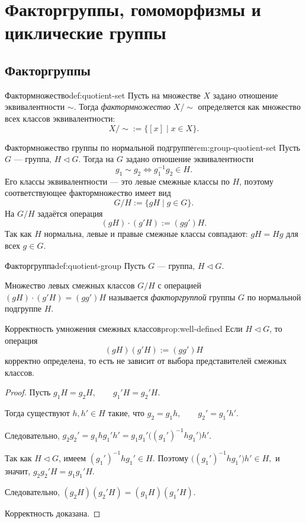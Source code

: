 
\section{Факторгруппы, гомоморфизмы и циклические группы}

\subsection{Факторгруппы}

\begin{Definition}{Фактормножество}{def:quotient-set}
	Пусть на множестве $X$ задано отношение эквивалентности $\sim$. Тогда \emph{фактормножество} $X/{\sim}$ определяется как множество всех классов эквивалентности:
	\[
	X/{\sim}:=\{[x] \mid x\in X\}.
	\]
\end{Definition}

\begin{Remark}{Фактормножество группы по нормальной подгруппе}{rem:group-quotient-set}
	Пусть $G$ --- группа, $H \triangleleft G$. Тогда на $G$ задано отношение эквивалентности
	\[
	g_1\sim g_2 \Longleftrightarrow g_1^{-1}g_2\in H.
	\]
	Его классы эквивалентности --- это левые смежные классы по $H$, поэтому соответствующее фактормножество имеет вид
	\[
	G/H:=\{gH\mid g\in G\}.
	\]
	На $G/H$ задаётся операция
	\[
	(gH)\cdot(g'H):=(gg')H.
	\]
	Так как $H$ нормальна, левые и правые смежные классы совпадают: $gH=Hg$ для всех $g\in G$.
\end{Remark}

\begin{Definition}{Факторгруппа}{def:quotient-group}
	Пусть $G$ — группа, $H \triangleleft G$. 
	
	Множество левых смежных классов $G/H$ с операцией $(gH) \cdot (g'H) = (gg')H$ называется \emph{факторгруппой} группы $G$ по нормальной подгруппе $H$.
\end{Definition}

\begin{Proposition}{Корректность умножения смежных классов}{prop:well-defined}
	Если $H \triangleleft G$, то операция
	\[
	(gH)(g'H) := (gg')H
	\]
	корректно определена, то есть не зависит от выбора представителей смежных классов.
\end{Proposition}

\begin{proof}
	Пусть $g_1H=g_2H, \qquad g_1'H=g_2'H$.
	
	Тогда существуют $h,h'\in H$ такие, что $g_2=g_1h, \qquad g_2'=g_1'h'$.

	Следовательно, $g_2g_2' = g_1 h g_1' h' = g_1 g_1'\bigl((g_1')^{-1} h g_1'\bigr)h'$.

	Так как $H \triangleleft G$, имеем $(g_1')^{-1} h g_1' \in H$. Поэтому $\bigl((g_1')^{-1} h g_1'\bigr)h' \in H,$ и значит, $g_2g_2'H = g_1g_1'H.$

	Следовательно, $(g_2H)(g_2'H)=(g_1H)(g_1'H).$

	Корректность доказана.
\end{proof}

